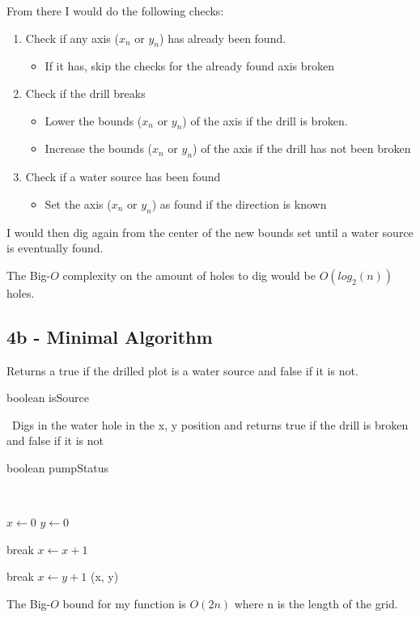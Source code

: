 \documentclass[oneside, a4paper]{article}
\begin{document}
From there I would do the following checks:
\begin{enumerate}
    \item Check if any axis ($x_n$ or $y_n$) has already been found. 
    \begin{itemize}
        \item If it has, skip the checks for the already found axis broken
    \end{itemize}
    \item Check if the drill breaks
        \begin{itemize}
            \item Lower the bounds ($x_n$ or $y_n$) of the axis if the drill is broken. 
            \item Increase the bounds ($x_n$ or $y_n$) of the axis if the drill has not been broken
        \end{itemize}
    \item Check if a water source has been found
    \begin{itemize}
        \item Set the axis ($x_n$ or $y_n$) as found if the direction is known
    \end{itemize}
\end{enumerate}

I would then dig again from the center of the new bounds set until a water source is eventually found.

The Big-$O$ complexity on the amount of holes to dig would be $O(log_2(n))$ holes.

\subsection*{4b - Minimal Algorithm}

Returns a true if the drilled plot is a water source and false if it is not.
\begin{algorithmic}[1]
        \State \Return boolean isSource
    \EndFunction
\end{algorithmic}
\
Digs in the water hole in the x, y position and returns true if the drill is broken and false if it is not
\begin{algorithmic}[1]
        \State \Return boolean pumpStatus
    \EndFunction
\end{algorithmic}

\
\begin{algorithmic}[1]
    \State $x \gets 0$
    \State $y \gets 0$
    
            \State break
        \Else \State $x \gets x + 1$
        \EndIf
    \EndWhile
    
            \State break
        \Else \State $x \gets y + 1$
        \EndIf
    \EndWhile
    \State \Return (x, y)
    \EndFunction
\end{algorithmic}

The Big-$O$ bound for my function is $O(2n)$ where n is the length of the grid.
\end{document}
